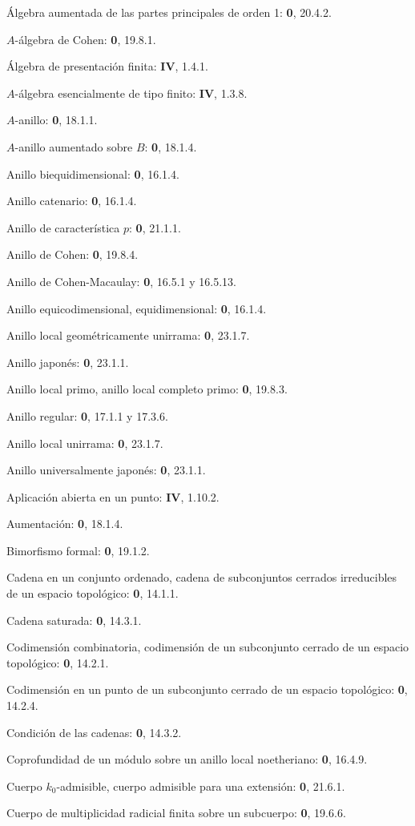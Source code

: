 Álgebra aumentada de las partes principales de orden 1: \textbf{0}, 20.4.2.\par
$A$-álgebra de Cohen: \textbf{0}, 19.8.1.\par
Álgebra de presentación finita: \textbf{IV}, 1.4.1.\par
$A$-álgebra esencialmente de tipo finito: \textbf{IV}, 1.3.8.\par
$A$-anillo: \textbf{0}, 18.1.1.\par
$A$-anillo aumentado sobre $B$: \textbf{0}, 18.1.4.\par
Anillo biequidimensional: \textbf{0}, 16.1.4.\par
Anillo catenario: \textbf{0}, 16.1.4.\par
Anillo de característica $p$: \textbf{0}, 21.1.1.\par
Anillo de Cohen: \textbf{0}, 19.8.4.\par
Anillo de Cohen-Macaulay: \textbf{0}, 16.5.1 y 16.5.13.\par
Anillo equicodimensional, equidimensional: \textbf{0}, 16.1.4.\par
Anillo local geométricamente unirrama: \textbf{0}, 23.1.7.\par
Anillo japonés: \textbf{0}, 23.1.1.\par
Anillo local primo, anillo local completo primo: \textbf{0}, 19.8.3.\par
Anillo regular: \textbf{0}, 17.1.1 y 17.3.6.\par
Anillo local unirrama: \textbf{0}, 23.1.7.\par
Anillo universalmente japonés: \textbf{0}, 23.1.1.\par
Aplicación abierta en un punto: \textbf{IV}, 1.10.2.\par
Aumentación: \textbf{0}, 18.1.4.\par

Bimorfismo formal: \textbf{0}, 19.1.2.\par

Cadena en un conjunto ordenado, cadena de subconjuntos cerrados irreducibles de un espacio topológico: \textbf{0}, 14.1.1.\par
Cadena saturada: \textbf{0}, 14.3.1.\par
Codimensión combinatoria, codimensión de un subconjunto cerrado de un espacio topológico: \textbf{0}, 14.2.1.\par
Codimensión en un punto de un subconjunto cerrado de un espacio topológico: \textbf{0}, 14.2.4.\par
Condición de las cadenas: \textbf{0}, 14.3.2.\par
Coprofundidad de un módulo sobre un anillo local noetheriano: \textbf{0}, 16.4.9.\par
Cuerpo $k_0$-admisible, cuerpo admisible para una extensión: \textbf{0}, 21.6.1.\par
Cuerpo de multiplicidad radicial finita sobre un subcuerpo: \textbf{0}, 19.6.6.\par

